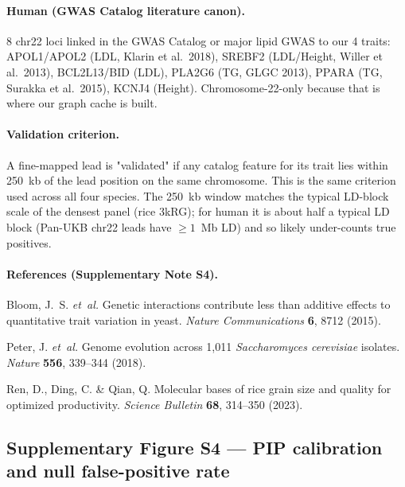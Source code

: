 \paragraph{Human (GWAS Catalog literature canon).}
8 chr22 loci linked in the GWAS Catalog or major lipid GWAS
to our 4 traits: APOL1/APOL2 (LDL, Klarin et al.\ 2018),
SREBF2 (LDL/Height, Willer et al.\ 2013), BCL2L13/BID (LDL),
PLA2G6 (TG, GLGC 2013), PPARA (TG, Surakka et al.\ 2015),
KCNJ4 (Height). Chromosome-22-only because that is
where our graph cache is built.

\paragraph{Validation criterion.} A fine-mapped lead is "validated"
if any catalog feature for its trait lies within 250~kb of the lead
position on the same chromosome. This is the same criterion used
across all four species. The 250~kb window matches the typical
LD-block scale of the densest panel (rice 3kRG); for human it is
about half a typical LD block (Pan-UKB chr22 leads have $\geq 1$~Mb
LD) and so likely under-counts true positives.

\paragraph{References (Supplementary Note S4).}
\begin{enumerate}[leftmargin=2.2em,itemsep=0.2em,topsep=0.2em,label={[\arabic*]}]
\item\label{snote_S4_ref1} Bloom, J.~S. \emph{et~al.} Genetic
interactions contribute less than additive effects to quantitative
trait variation in yeast. \textit{Nature Communications}
\textbf{6}, 8712 (2015).
\item\label{snote_S4_ref2} Peter, J. \emph{et~al.} Genome evolution
across 1{,}011 \textit{Saccharomyces cerevisiae} isolates.
\textit{Nature} \textbf{556}, 339--344 (2018).
\item\label{snote_S4_ref3} Ren, D., Ding, C. \& Qian, Q. Molecular
bases of rice grain size and quality for optimized productivity.
\textit{Science Bulletin} \textbf{68}, 314--350 (2023).
\end{enumerate}

\clearpage

\subsection*{Supplementary Figure S4 --- PIP calibration and null false-positive rate}

